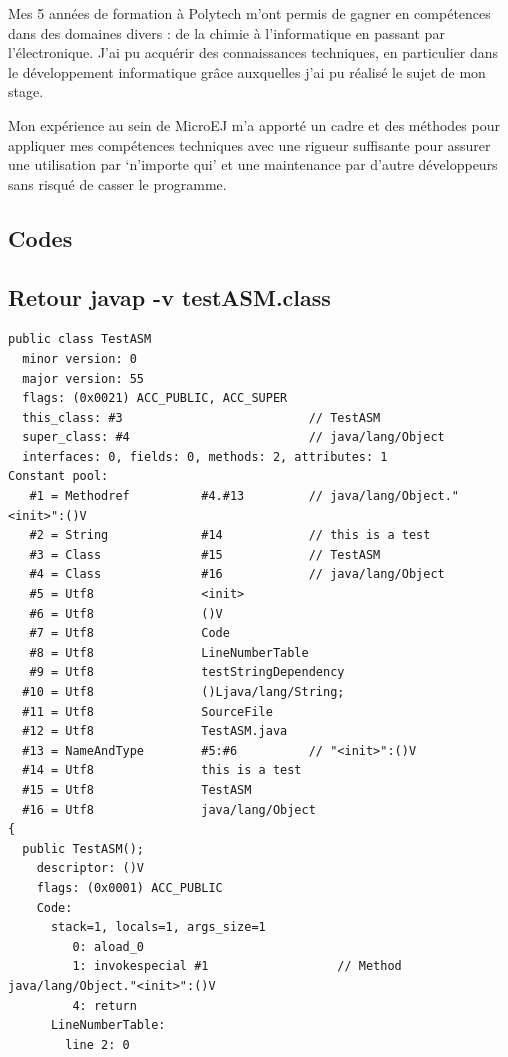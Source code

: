 \documentclass[french,a4paper,12pt]{report}
\begin{document}
Mes 5 années de formation à Polytech m’ont permis de gagner en compétences dans des domaines divers : de la chimie à l’informatique en passant par l’électronique. J’ai pu acquérir des connaissances techniques, en particulier dans le développement informatique grâce auxquelles j'ai pu réalisé le sujet de mon stage.

Mon expérience au sein de MicroEJ m’a apporté un cadre et des méthodes pour appliquer mes compétences techniques avec une rigueur suffisante pour assurer une utilisation par ‘n’importe qui’ et une maintenance par d’autre développeurs sans risqué de casser le programme.

\begin{appendices}
    
\chapter*{Codes}

\section*{Retour javap -v testASM.class}
\label{javapVtestASM}

\begin{lstlisting}
public class TestASM
  minor version: 0
  major version: 55
  flags: (0x0021) ACC_PUBLIC, ACC_SUPER
  this_class: #3                          // TestASM
  super_class: #4                         // java/lang/Object
  interfaces: 0, fields: 0, methods: 2, attributes: 1
Constant pool:
   #1 = Methodref          #4.#13         // java/lang/Object."<init>":()V
   #2 = String             #14            // this is a test
   #3 = Class              #15            // TestASM
   #4 = Class              #16            // java/lang/Object
   #5 = Utf8               <init>
   #6 = Utf8               ()V
   #7 = Utf8               Code
   #8 = Utf8               LineNumberTable
   #9 = Utf8               testStringDependency
  #10 = Utf8               ()Ljava/lang/String;
  #11 = Utf8               SourceFile
  #12 = Utf8               TestASM.java
  #13 = NameAndType        #5:#6          // "<init>":()V
  #14 = Utf8               this is a test
  #15 = Utf8               TestASM
  #16 = Utf8               java/lang/Object
{
  public TestASM();
    descriptor: ()V
    flags: (0x0001) ACC_PUBLIC
    Code:
      stack=1, locals=1, args_size=1
         0: aload_0
         1: invokespecial #1                  // Method java/lang/Object."<init>":()V
         4: return
      LineNumberTable:
        line 2: 0


\end{lstlisting}
\end{appendices}
\end{document}
